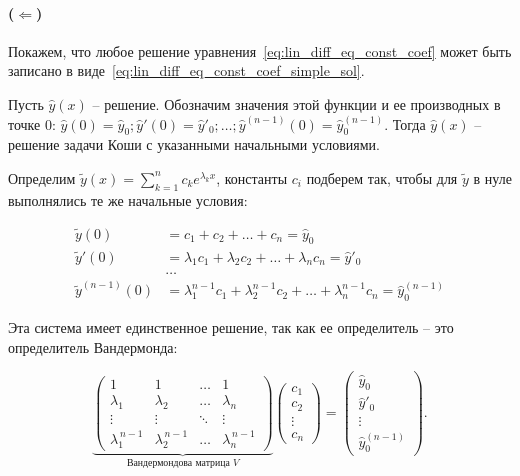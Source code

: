 \paragraph{($\Leftarrow$)} Покажем, что любое решение уравнения~\ref{eq:lin_diff_eq_const_coef} может быть записано в виде~\ref{eq:lin_diff_eq_const_coef_simple_sol}.

Пусть $\hat{y}(x)$ -- решение.
Обозначим значения этой функции и ее производных в точке 0: $\hat{y}(0) = \hat{y}_0; \hat{y}'(0) = \hat{y}'_0; \dots; \hat{y}^{(n-1)}(0) = \hat{y}^{(n-1)}_0$.
Тогда $\hat{y}(x)$ -- решение задачи Коши с указанными начальными условиями.

Определим $\tilde{y}(x) = \sum_{k=1}^n c_k e^{\lambda_k x}$, константы $c_i$ подберем так, чтобы для $\tilde{y}$ в нуле выполнялись те же начальные условия:

\begin{align*}
    \tilde{y}(0) &= c_1 + c_2 + \dots + c_n = \hat{y}_0 \\
    \tilde{y}'(0) &= \lambda_1 c_1 + \lambda_2 c_2 + \dots + \lambda_n c_n = \hat{y}'_0 \\
    &\dots \\
    \tilde{y}^{(n-1)}(0) &= \lambda_1^{n-1} c_1 + \lambda_2^{n-1} c_2 + \dots + \lambda_n^{n-1} c_n = \hat{y}^{(n-1)}_0
\end{align*}

Эта система имеет единственное решение, так как ее определитель -- это определитель Вандермонда:

\begin{equation*}
    \underbrace{
        \begin{pmatrix}
            1 & 1 & \dots & 1 \\
            \lambda_1 & \lambda_2 & \dots & \lambda_n \\
            \vdots & \vdots & \ddots & \vdots \\
            \lambda_1^{\,n-1} & \lambda_2^{\,n-1} & \dots & \lambda_n^{\,n-1}
        \end{pmatrix}}_{\text{Вандермондова матрица } V}
    \begin{pmatrix}
        c_1 \\ c_2 \\ \vdots \\ c_n
    \end{pmatrix}
    =
    \begin{pmatrix}
        \hat{y}_0 \\ \hat{y}'_0 \\ \vdots \\ \hat{y}^{(n-1)}_0
    \end{pmatrix}.
\end{equation*}

